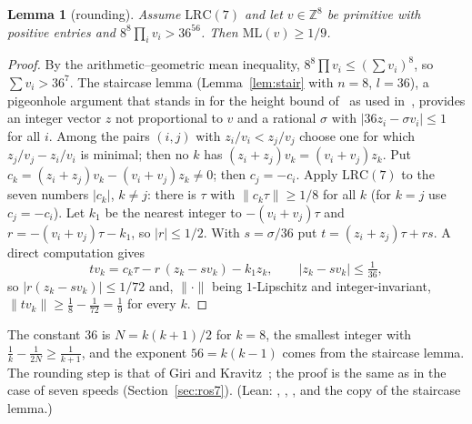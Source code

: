 \documentclass[11pt]{article}
\newtheorem{lemma}[theorem]{Lemma}
\theoremstyle{remark}
\newcommand{\ML}{\mathrm{ML}}
\newcommand{\Z}{\mathbb{Z}}
\newcommand{\dist}[1]{\lVert #1\rVert}
\begin{document}
\begin{lemma}[rounding]\label{lem:round}
Assume $\mathrm{LRC}(7)$ and let $v\in\Z^8$ be primitive with positive entries and $8^8\prod_iv_i>36^{56}$. Then $\ML(v)\ge1/9$.
\end{lemma}
\begin{proof}
By the arithmetic--geometric mean inequality, $8^8\prod v_i\le(\sum v_i)^8$, so $\sum v_i>36^7$. The staircase lemma (Lemma~\ref{lem:stair} with $n=8$, $l=36$), a pigeonhole argument that stands in for the height bound of~\cite{MSS} as used in~\cite{Ros8}, provides an integer vector $z$ not proportional to $v$ and a rational $\sigma$ with $|36z_i-\sigma v_i|\le1$ for all $i$. Among the pairs $(i,j)$ with $z_i/v_i<z_j/v_j$ choose one for which $z_j/v_j-z_i/v_i$ is minimal; then no $k$ has $(z_i+z_j)v_k=(v_i+v_j)z_k$. Put $c_k=(z_i+z_j)v_k-(v_i+v_j)z_k\ne0$; then $c_j=-c_i$. Apply $\mathrm{LRC}(7)$ to the seven numbers $|c_k|$, $k\ne j$: there is $\tau$ with $\dist{c_k\tau}\ge1/8$ for all $k$ (for $k=j$ use $c_j=-c_i$). Let $k_1$ be the nearest integer to $-(v_i+v_j)\tau$ and $r=-(v_i+v_j)\tau-k_1$, so $|r|\le1/2$. With $s=\sigma/36$ put $t=(z_i+z_j)\tau+rs$. A direct computation gives
\[
tv_k=c_k\tau-r\,(z_k-sv_k)-k_1z_k,\qquad |z_k-sv_k|\le\tfrac1{36},
\]
so $|r(z_k-sv_k)|\le1/72$ and, $\dist{\cdot}$ being $1$-Lipschitz and integer-invariant, $\dist{tv_k}\ge\frac18-\frac1{72}=\frac19$ for every $k$.
\end{proof}
The constant $36$ is $N=k(k+1)/2$ for $k=8$, the smallest integer with $\frac1k-\frac1{2N}\ge\frac1{k+1}$, and the exponent $56=k(k-1)$ comes from the staircase lemma. The rounding step is that of Giri and Kravitz~\cite{GK}; the proof is the same as in the case of seven speeds (Section~\ref{sec:ros7}). (Lean: , , , and the copy  of the staircase lemma.)
\end{document}
